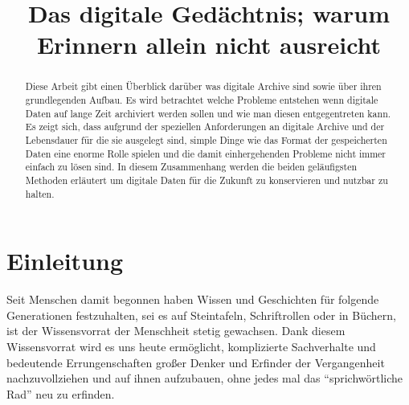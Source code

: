 \documentclass[conference,compsoc,final,a4paper]{IEEEtran}
\newcommand{\autoren}[0]{Nockel, Sascha}
\newcommand{\dokumententitel}[0]{Das digitale Gedächtnis; warum Erinnern allein nicht ausreicht}
\begin{document}
\title{\dokumententitel}

\author{
  \IEEEauthorblockN{\autoren}
}

\maketitle
\thispagestyle{plain}
\pagestyle{plain}


\begin{abstract}
Diese Arbeit gibt einen Überblick darüber was digitale Archive sind sowie über ihren grundlegenden Aufbau. Es wird betrachtet welche Probleme entstehen wenn digitale Daten auf lange Zeit archiviert werden sollen und wie man diesen entgegentreten kann. Es zeigt sich, dass aufgrund der speziellen Anforderungen an digitale Archive und der Lebensdauer für die sie ausgelegt sind, simple Dinge wie das Format der gespeicherten Daten eine enorme Rolle spielen und die damit einhergehenden Probleme nicht immer einfach zu lösen sind. In diesem Zusammenhang werden die beiden geläufigsten Methoden erläutert um digitale Daten für die Zukunft zu konservieren und nutzbar zu halten.

\end{abstract}

{\small\tableofcontents}

\section{Einleitung}
Seit Menschen damit begonnen haben Wissen und Geschichten für folgende Generationen festzuhalten, sei es auf Steintafeln, Schriftrollen oder in Büchern, ist der Wissensvorrat der Menschheit stetig gewachsen. Dank diesem Wissensvorrat wird es uns heute ermöglicht, komplizierte Sachverhalte und bedeutende Errungenschaften großer Denker und Erfinder der Vergangenheit nachzuvollziehen und auf ihnen aufzubauen, ohne jedes mal das \enquote{sprichwörtliche Rad} neu zu erfinden.
\end{document}
